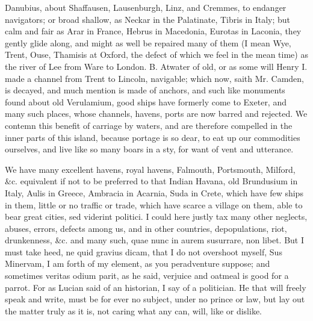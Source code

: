 {Danubius, about Shaffausen, Lausenburgh, Linz, and Cremmes, to endanger
navigators; or broad shallow, as Neckar in the Palatinate, Tibris in
Italy; but calm and fair as Arar in France, Hebrus in Macedonia,
Eurotas in Laconia, they gently glide along, and might as well be
repaired many of them (I mean Wye, Trent, Ouse, Thamisis at Oxford, the
defect of which we feel in the mean time) as the river of Lee from Ware
to London. B. Atwater of old, or as some will Henry I. made a
channel from Trent to Lincoln, navigable; which now, saith Mr. Camden,
is decayed, and much mention is made of anchors, and such like
monuments found about old Verulamium, good ships have formerly
come to Exeter, and many such places, whose channels, havens, ports are
now barred and rejected. We contemn this benefit of carriage by waters,
and are therefore compelled in the inner parts of this island, because
portage is so dear, to eat up our commodities ourselves, and live like
so many boars in a sty, for want of vent and utterance.

We have many excellent havens, royal havens, Falmouth, Portsmouth,
Milford, \&c. equivalent if not to be preferred to that Indian Havana,
old Brundusium in Italy, Aulis in Greece, Ambracia in Acarnia, Suda in
Crete, which have few ships in them, little or no traffic or trade,
which have scarce a village on them, able to bear great cities, sed
viderint politici. I could here justly tax many other neglects, abuses,
errors, defects among us, and in other countries, depopulations, riot,
drunkenness, \&c. and many such, quae nunc in aurem susurrare, non
libet. But I must take heed, ne quid gravius dicam, that I do not
overshoot myself, Sus Minervam, I am forth of my element, as you
peradventure suppose; and sometimes veritas odium parit, as he said,
verjuice and oatmeal is good for a parrot. For as Lucian said of an
historian, I say of a politician. He that will freely speak and write,
must be for ever no subject, under no prince or law, but lay out the
matter truly as it is, not caring what any can, will, like or dislike.

}
